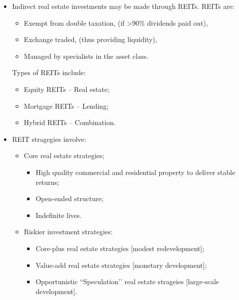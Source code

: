 \documentclass[../notes_compiled.tex]{subfiles}
\begin{document}
\begin{itemize}
\begin{itemize}
\item[+] Diversification from traditional assets,
\item[+] Favourable tax treatment of real estate investments.
\end{itemize}
and drawbacks include:
\begin{itemize}
\item Illiquidity of assets and opacity of pricing,
\item Additional complexity of managing and maintaining property assets,
\item Specialised knowledge required when choosing investments,
\item High level of capital required upfront to invest,
\item Concentration risk.
\end{itemize}

\item Indirect real estate investments may be made through REITs. REITs are:
\begin{itemize}
\item Exempt from double taxation, (if >90\% dividends paid out),
\item Exchange traded, (thus providing liquidity),
\item Managed by specialists in the asset class.
\end{itemize}
Types of REITs include:
\begin{itemize}
\item Equity REITs -- Real estate;
\item Mortgage REITs -- Lending;
\item Hybrid REITs -- Combination.
\end{itemize}
\item REIT stragegies involve:
\begin{itemize}
\item Core real estate strategies;
\begin{itemize}
\item High quality commercial and residential property to deliver stable returns;
\item Open-ended structure;
\item Indefinite lives.
\end{itemize}
\item Riskier investment strategies:
\begin{itemize}
\item Core-plus real estate strategies [modest redevelopment];
\item Value-add real estate strategies [monetary development];
\item Opportunistic ``Speculation’’ real estate strageies [large-scale development].
\end{itemize}
\end{itemize}
\end{itemize}
\end{document}

